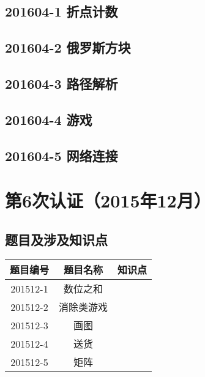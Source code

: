 \documentclass[cn,10pt,math=newtx,citestyle=gb7714-2015,bibstyle=gb7714-2015]{elegantbook}
\newif\ifonlyanalyze %
\begin{document}
\newpage
\section{201604-1 折点计数}
\ifonlyanalyze
\else
    
\fi


\newpage
\section{201604-2 俄罗斯方块}
\ifonlyanalyze
\else
    
\fi


\newpage
\section{201604-3 路径解析}
\ifonlyanalyze
\else
    
\fi


\newpage
\section{201604-4 游戏}
\ifonlyanalyze
\else
    
\fi


\newpage
\section{201604-5 网络连接}
\ifonlyanalyze
\else
    
\fi



\chapter{第6次认证（2015年12月）}

\section{题目及涉及知识点}

\begin{table}[htbp]
    \centering
    \begin{tabular}{ccc}
        \toprule
        题目编号 & 题目名称   & 知识点 \\
        \midrule
        201512-1 & 数位之和   &        \\
        201512-2 & 消除类游戏 &        \\
        201512-3 & 画图       &        \\
        201512-4 & 送货       &        \\
        201512-5 & 矩阵       &        \\
        \bottomrule
    \end{tabular}
\end{table}
\end{document}
